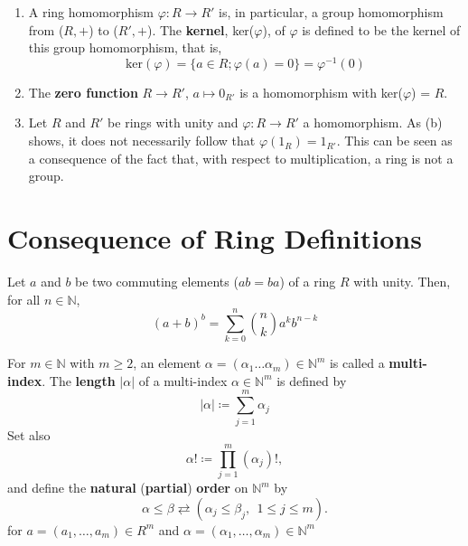 \begin{eg}
    \begin{enumerate}[label=(\alph*)]
        \item A ring homomorphism \(\varphi \colon R \rightarrow R{}'\) is, in particular, a
        group homomorphism from (\(R, +\)) to (\(R{}', +\)). The \textbf{kernel}, ker(\(\varphi\)),
        of \(\varphi\) is defined to be the kernel of this group homomorphism, that is,
        \[
          \text{ker}(\varphi) = \{ a \in R ; \varphi(a) = 0 \} = \varphi^{-1}(0)  
        \]
        \item The \textbf{zero function} \(R \rightarrow R{}'\), \(a \mapsto 0_{R{}'}\) is a
        homomorphism with ker(\(\varphi\)) = \(R\). 
        \item Let \(R\) and \(R{}'\) be rings with unity and \(\varphi \colon R \rightarrow R{}'\)
        a homomorphism. As (b) shows, it does not necessarily follow that \(\varphi\left(1_R\right) = 1_{R{}'}\). 
        This can be seen as a consequence of the fact that, with respect to multiplication, a ring 
        is not a group.
    \end{enumerate}
\end{eg}

\section{Consequence of Ring Definitions}

\begin{definition}\label{def: binomial_theorem}
    Let \(a\) and \(b\) be two commuting elements (\(ab = ba\)) of a ring \(R\) with unity.
    Then, for all \(n \in \mathbb{N}\),
    \[
        (a + b)^b = \sum^n_{k=0} \binom{n}{k}a^kb^{n-k}  
    \]
\end{definition}

\begin{lemma}
    For \(m \in \mathbb{N}\) with \(m \geq 2\), an element \(\alpha = \left(\alpha_1\ldots\alpha_m\right)
    \in \mathbb{N}^m\) is called a \textbf{multi-index}. The \textbf{length} \(\left | \alpha \right |\)
    of a multi-index \(\alpha \in \mathbb{N}^m\) is defined by 
    \[
        \left |  \alpha   \right |  \coloneqq \sum^m_{j=1}\alpha_j
    \]
    Set also 
    \[
        \alpha! \coloneqq \prod^m_{j=1} (\alpha_j)!,    
    \]
    and define the \textbf{natural} (\textbf{partial}) \textbf{order} on \(\mathbb{N}^m\) by
    \[
        \alpha \leq \beta \rightleftarrows (\alpha_j \leq \beta_j, \:\: 1 \leq j \leq m).   
    \]
    for \(a = \left(a_1, \ldots, a_m\right) \in R^m \) and \(\alpha = \left(\alpha_1,\ldots,\alpha_m\right)\in \mathbb{N}^m\)

\end{lemma}

